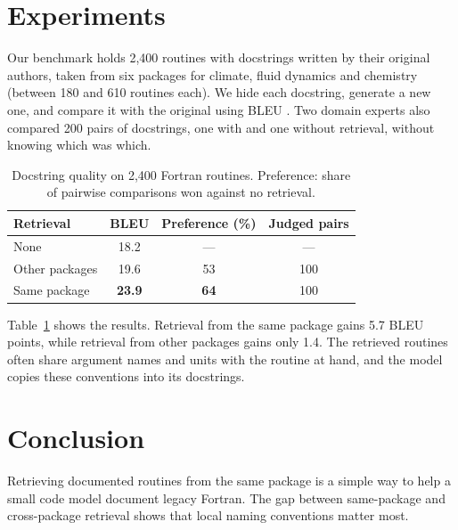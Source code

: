 \documentclass{article}
\begin{document}
\section{Experiments}
\label{sec:experiments}

Our benchmark holds 2,400 routines with docstrings written by their original authors, taken from six packages for climate, fluid dynamics and chemistry (between 180 and 610 routines each). %
We hide each docstring, generate a new one, and compare it with the original using BLEU \citep{papineni2002bleu}.
Two domain experts also compared 200 pairs of docstrings, one with and one without retrieval, without knowing which was which.

\begin{table}[t]
\caption{Docstring quality on 2,400 Fortran routines. Preference: share of pairwise comparisons won against no retrieval.}
\label{tab:results}
\centering
\begin{tabular}{lccc}
\toprule
Retrieval & BLEU & Preference (\%) & Judged pairs \\
\midrule
None & 18.2 & --- & --- \\
Other packages & 19.6 & 53 & 100 \\
Same package & \textbf{23.9} & \textbf{64} & 100 \\
\bottomrule
\end{tabular}
\end{table}

Table~\ref{tab:results} shows the results.
Retrieval from the same package gains 5.7 BLEU points, while retrieval from other packages gains only 1.4.
The retrieved routines often share argument names and units with the routine at hand, and the model copies these conventions into its docstrings.

\section{Conclusion}
\label{sec:conclusion}

Retrieving documented routines from the same package is a simple way to help a small code model document legacy Fortran.
The gap between same-package and cross-package retrieval shows that local naming conventions matter most.



\end{document}
